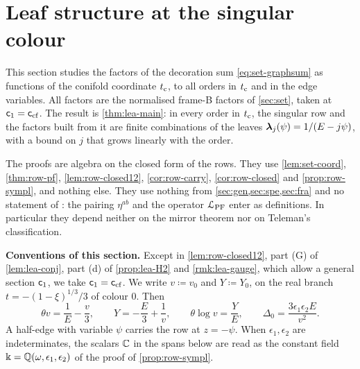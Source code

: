 \newcommand{\leaV}{\mathscr{V}}                 %
\newcommand{\leaDg}{\mathrm{D}_{\ccf}}          %
\newcommand{\leaDc}{\mathrm{D}_{\mathrm{c}}}    %
\newcommand{\leaY}{\mathcal{Y}}                 %
\newcommand{\leaU}{\widehat{\mathsf{U}}}        %

\section{Leaf structure at the singular colour}
\label{sec:lea}

This section studies the factors of the decoration sum \cref{eq:set-graphsum} as functions of the conifold coordinate $t_{\mathrm{c}}$, to all orders in $t_{\mathrm{c}}$ and in the edge variables. All factors are the normalised frame-B factors of \cref{sec:set}, taken at $\mathsf{c}_{1}=\mathsf{c}_{\mathrm{cf}}$. The result is \cref{thm:lea-main}: in every order in $t_{\mathrm{c}}$, the singular row and the factors built from it are finite combinations of the leaves $\boldsymbol{\lambda}_j(\psi)=1/(E-j\psi)$, with a bound on $j$ that grows linearly with the order.

The proofs are algebra on the closed form of the rows. They use \cref{lem:set-coord}, \cref{thm:row-pf}, \cref{lem:row-closed12}, \cref{cor:row-carry}, \cref{cor:row-closed} and \cref{prop:row-sympl}, and nothing else. They use nothing from \cref{sec:gen,sec:spe,sec:fra} and no statement of \cite{BS}: the pairing $\eta^{ab}$ and the operator $\mathcal{L}_{\mathrm{PF}}$ enter as definitions. In particular they depend neither on the mirror theorem nor on Teleman's classification.

\textbf{Conventions of this section.} Except in \cref{lem:row-closed12}, part (G) of \cref{lem:lea-conj}, part (d) of \cref{prop:lea-H2} and \cref{rmk:lea-gauge}, which allow a general section $\mathsf{c}_{1}$, we take $\mathsf{c}_{1}=\mathsf{c}_{\mathrm{cf}}$. We write $v\coloneqq v_0$ and $Y\coloneqq Y_0$, on the real branch $t=-(1-\xi)^{1/3}/3$ of colour $0$. Then
\begin{equation}\label{eq:lea-v}
\theta v=\frac1E-\frac v3,\qquad Y=-\frac E3+\frac1v,\qquad \theta\log v=\frac YE,\qquad \Delta_0=\frac{3\epsilon_1\epsilon_2E}{v^{2}}.
\end{equation}
A half-edge with variable $\psi$ carries the row at $z=-\psi$. When $\epsilon_1,\epsilon_2$ are indeterminates, the scalars $\mathbb{C}$ in the spans below are read as the constant field $\Bbbk=\mathbb{Q}(\omega,\epsilon_1,\epsilon_2)$ of the proof of \cref{prop:row-sympl}. 

